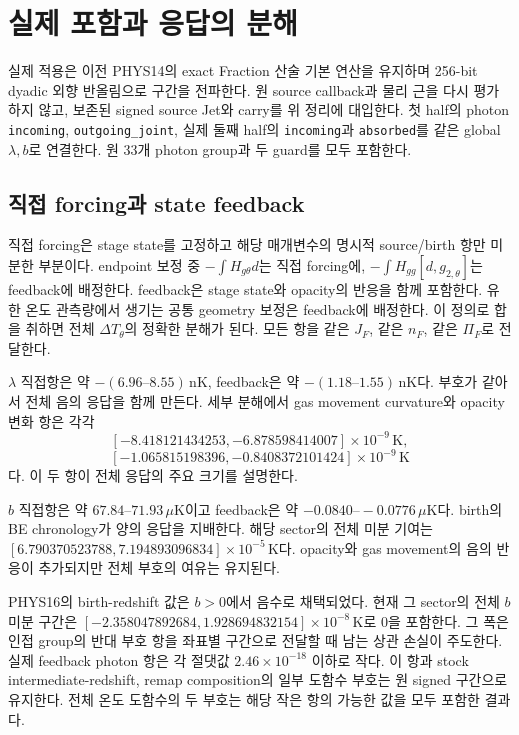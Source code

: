 \section{실제 포함과 응답의 분해}
\label{sec:application}
실제 적용은 이전 PHYS14의 exact Fraction 산술 기본 연산을 유지하며 256-bit dyadic 외향 반올림으로 구간을 전파한다. 원 source callback과 물리 근을 다시 평가하지 않고, 보존된 signed source Jet와 carry를 위 정리에 대입한다. 첫 half의 photon \texttt{incoming}, \texttt{outgoing\_joint}, 실제 둘째 half의 \texttt{incoming}과 \texttt{absorbed}를 같은 global $\lambda,b$로 연결한다. 원 33개 photon group과 두 guard를 모두 포함한다.\cite{app17,phys16}

\subsection{직접 forcing과 state feedback}

직접 forcing은 stage state를 고정하고 해당 매개변수의 명시적 source/birth 항만 미분한 부분이다. endpoint 보정 중 $-\int H_{g\theta}d$는 직접 forcing에, $-\int H_{gg}[d,g_{2,\theta}]$는 feedback에 배정한다. feedback은 stage state와 opacity의 반응을 함께 포함한다. 유한 온도 관측량에서 생기는 공통 geometry 보정은 feedback에 배정한다. 이 정의로 합을 취하면 전체 $\Delta T_\theta$의 정확한 분해가 된다. 모든 항을 같은 $J_F$, 같은 $n_F$, 같은 $\Pi_F$로 전달한다.\cite{forcing17}

$\lambda$ 직접항은 약 $-(6.96\text{--}8.55)\,\mathrm{nK}$, feedback은 약 $-(1.18\text{--}1.55)\,\mathrm{nK}$다. 부호가 같아서 전체 음의 응답을 함께 만든다. 세부 분해에서 gas movement curvature와 opacity 변화 항은 각각\[[-8.418121434253,-6.878598414007]\times10^{-9}\,\mathrm K,\]\[[-1.065815198396,-0.8408372101424]\times10^{-9}\,\mathrm K\]다. 이 두 항이 전체 응답의 주요 크기를 설명한다.\cite{app17,forcing17}

$b$ 직접항은 약 $67.84\text{--}71.93\,\mu\mathrm K$이고 feedback은 약 $-0.0840\text{--}-0.0776\,\mu\mathrm K$다. birth의 BE chronology가 양의 응답을 지배한다. 해당 sector의 전체 미분 기여는 $[6.790370523788,7.194893096834]\times10^{-5}\,\mathrm K$다. opacity와 gas movement의 음의 반응이 추가되지만 전체 부호의 여유는 유지된다.\cite{app17,forcing17}

PHYS16의 birth-redshift 값은 $b>0$에서 음수로 채택되었다. 현재 그 sector의 전체 $b$ 미분 구간은 $[-2.358047892684,1.928694832154]\times10^{-8}\,\mathrm K$로 0을 포함한다. 그 폭은 인접 group의 반대 부호 항을 좌표별 구간으로 전달할 때 남는 상관 손실이 주도한다. 실제 feedback photon 항은 각 절댓값 $2.46\times10^{-18}$ 이하로 작다. 이 항과 stock intermediate-redshift, remap composition의 일부 도함수 부호는 원 signed 구간으로 유지한다. 전체 온도 도함수의 두 부호는 해당 작은 항의 가능한 값을 모두 포함한 결과다.\cite{phys16,app17}


